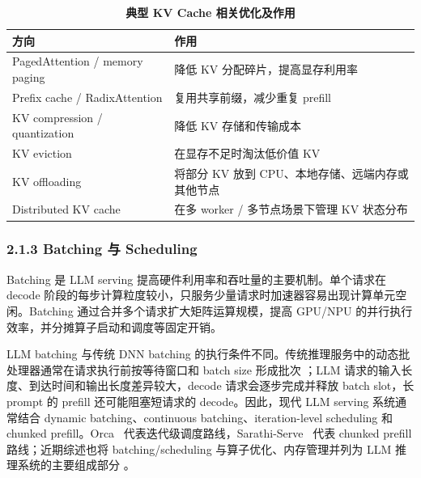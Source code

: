 \begin{table}[!htbp]
    \centering
    \caption{\textbf{典型 KV Cache 相关优化及作用}}
    \label{tab:kv-cache-optimizations}
    \renewcommand{\arraystretch}{1.45}
    \scriptsize
    \setlength{\tabcolsep}{4pt}
    \begin{tabularx}{\textwidth}{@{}>{\hsize=0.55\hsize\raggedright\arraybackslash}X >{\hsize=1.45\hsize\raggedright\arraybackslash}X@{}}
        \toprule
        \textbf{方向} & \textbf{作用} \\
        \midrule
        PagedAttention / memory paging & 降低 KV 分配碎片，提高显存利用率 \\
        \tabrowrule
        Prefix cache / RadixAttention & 复用共享前缀，减少重复 prefill \\
        \tabrowrule
        KV compression / quantization & 降低 KV 存储和传输成本 \\
        \tabrowrule
        KV eviction & 在显存不足时淘汰低价值 KV \\
        \tabrowrule
        KV offloading & 将部分 KV 放到 CPU、本地存储、远端内存或其他节点 \\
        \tabrowrule
        Distributed KV cache & 在多 worker / 多节点场景下管理 KV 状态分布 \\
        \bottomrule
    \end{tabularx}
\end{table}




\subsubsection*{2.1.3 Batching 与 Scheduling}

Batching 是 LLM serving 提高硬件利用率和吞吐量的主要机制。单个请求在 decode 阶段的每步计算粒度较小，只服务少量请求时加速器容易出现计算单元空闲。Batching 通过合并多个请求扩大矩阵运算规模，提高 GPU/NPU 的并行执行效率，并分摊算子启动和调度等固定开销。


LLM batching 与传统 DNN batching 的执行条件不同。传统推理服务中的动态批处理器通常在请求执行前按等待窗口和 batch size 形成批次 \cite{nvidia2026triton}；LLM 请求的输入长度、到达时间和输出长度差异较大，decode 请求会逐步完成并释放 batch slot，长 prompt 的 prefill 还可能阻塞短请求的 decode。因此，现代 LLM serving 系统通常结合 dynamic batching、continuous batching、iteration-level scheduling 和 chunked prefill。Orca~\cite{yu2022orca} 代表迭代级调度路线，Sarathi-Serve~\cite{agrawal2024taming} 代表 chunked prefill 路线；近期综述也将 batching/scheduling 与算子优化、内存管理并列为 LLM 推理系统的主要组成部分 \cite{zhou2024survey,zhen2025taming,pan2025survey}。


